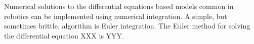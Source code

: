 Numerical solutions to the differential equations based models common in robotics can be implemented using numerical integration.  A simple, but sometimes brittle, algorithm is Euler integration.  The Euler method for solving the differential equation XXX is YYY.







